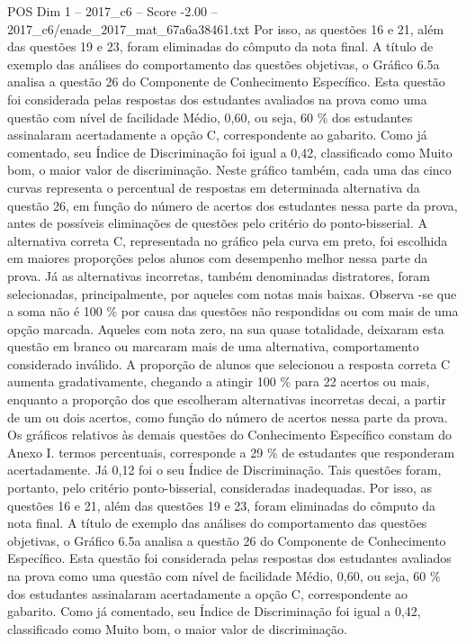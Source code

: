 \begin{textsample}{POS Dim 1 – 2017\_c6 – Score -2.00 – 2017\_c6/enade\_2017\_mat\_67a6a38461.txt}
Por isso, as questões 16 e 21, além das questões 19 e 23, foram eliminadas do cômputo da nota final.
A título de exemplo das análises do comportamento das questões objetivas, o Gráfico 6.5a analisa a questão 26 do Componente de Conhecimento Específico.
Esta questão foi considerada pelas respostas dos estudantes avaliados na prova como uma questão com nível de facilidade Médio, 0,60, ou seja, 60 \% dos estudantes assinalaram acertadamente a opção C, correspondente ao gabarito.
Como já comentado, seu Índice de Discriminação foi igual a 0,42, classificado como Muito bom, o maior valor de discriminação.
Neste gráfico também, cada uma das cinco curvas representa o percentual de respostas em determinada alternativa da questão 26, em função do número de acertos dos estudantes nessa parte da prova, antes de possíveis eliminações de questões pelo critério do ponto-bisserial.
A alternativa correta C, representada no gráfico pela curva em preto, foi escolhida em maiores proporções pelos alunos com desempenho melhor nessa parte da prova.
Já as alternativas incorretas, também denominadas distratores, foram selecionadas, principalmente, por aqueles com notas mais baixas.
Observa -se que a soma não é 100 \% por causa das questões não respondidas ou com mais de uma opção marcada.
Aqueles com nota zero, na sua quase totalidade, deixaram esta questão em branco ou marcaram mais de uma alternativa, comportamento considerado inválido.
A proporção de alunos que selecionou a resposta correta C aumenta gradativamente, chegando a atingir 100 \% para 22 acertos ou mais, enquanto a proporção dos que escolheram alternativas incorretas decai, a partir de um ou dois acertos, como função do número de acertos nessa parte da prova.
Os gráficos relativos às demais questões do Conhecimento Específico constam do Anexo I. termos percentuais, corresponde a 29 \% de estudantes que responderam acertadamente.
Já 0,12 foi o seu Índice de Discriminação.
Tais questões foram, portanto, pelo critério ponto-bisserial, consideradas inadequadas.
Por isso, as questões 16 e 21, além das questões 19 e 23, foram eliminadas do cômputo da nota final.
A título de exemplo das análises do comportamento das questões objetivas, o Gráfico 6.5a analisa a questão 26 do Componente de Conhecimento Específico.
Esta questão foi considerada pelas respostas dos estudantes avaliados na prova como uma questão com nível de facilidade Médio, 0,60, ou seja, 60 \% dos estudantes assinalaram acertadamente a opção C, correspondente ao gabarito.
Como já comentado, seu Índice de Discriminação foi igual a 0,42, classificado como Muito bom, o maior valor de discriminação.

\end{textsample}
